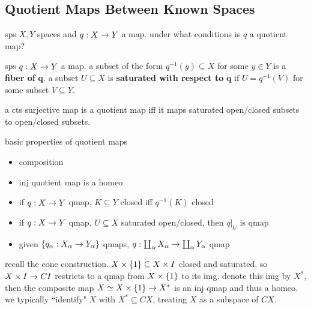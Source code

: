 \subsection{Quotient Maps Between Known Spaces}
sps $X,Y$ spaces and $q:X\rightarrow Y$ a map. under what conditions is $q$ a quotient
map?

\begin{defn}
    sps $q:X\rightarrow Y$ a map. a subset of the form $q^{-1}(y)\subseteq X$ for some
    $y\in Y$ is a \textbf{fiber of} $\bm{q}$. a subset $U\subseteq X$ is
    \textbf{saturated with respect to} $\bm{q}$ if $U=q^{-1}(V)$ for some
    subset $V\subseteq Y$.
\end{defn}

\begin{prop}
    a cts surjective map is a quotient map iff it maps saturated open/closed
    subsets to open/closed subsets.
\end{prop}

\begin{prop}
    basic properties of quotient maps
    \begin{itemize}
        \item composition
        \item inj quotient map is a homeo
        \item if $q:X\rightarrow Y$ qmap, $K\subseteq Y$ closed iff $q^{-1}(K)$ closed
        \item if $q:X\rightarrow Y$ qmap, $U\subseteq X$ saturated open/closed, then
            $q\rvert_{U}$ is qmap
        \item given $\left\{{q_{\alpha}:X_{\alpha}\rightarrow Y_{\alpha}}\right\}$ qmaps,
            $q:\coprod_{\alpha}X_{\alpha}\rightarrow\coprod_{\alpha}Y_{\alpha}$ qmap
    \end{itemize}
\end{prop}

\begin{xmp}[source=Primary Source Material]
    recall the cone construction. $X \times \left\{{1}\right\} \subseteq X\times I$ closed
    and saturated, so $X\times I \rightarrow CI$ restricts to a qmap from $X \times
    \left\{{1}\right\}$ to its img. denote this img by $X^{*}$, then the composite map
    $X \simeq X\times\left\{{1}\right\}\rightarrow X^{*}$ is an inj qmap and thus a homeo. we
    typically ``identify" $X$ with $X^{*}\subseteq CX$, treating $X$ as a
    subspace of $CX$.
\end{xmp}

